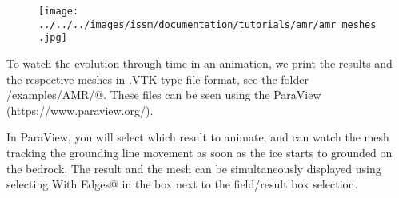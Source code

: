 \begin{figure}[H]
	\begin{center}
		\texttt{[image: ../../../images/issm/documentation/tutorials/amr/amr\_meshes.jpg]}
	\end{center}
\end{figure}

To watch the evolution through time in an animation, we print the results and the respective meshes in .VTK-type file format, see the folder \verb@trunk/examples/AMR/@. These files can be seen using the ParaView (https://www.paraview.org/).

In ParaView, you will select which result to animate, and can watch the mesh tracking the grounding line movement as soon as the ice starts to grounded on the bedrock. The result and the mesh can be simultaneously displayed using selecting \verb@Surface With Edges@ in the box next to the field/result box selection.
